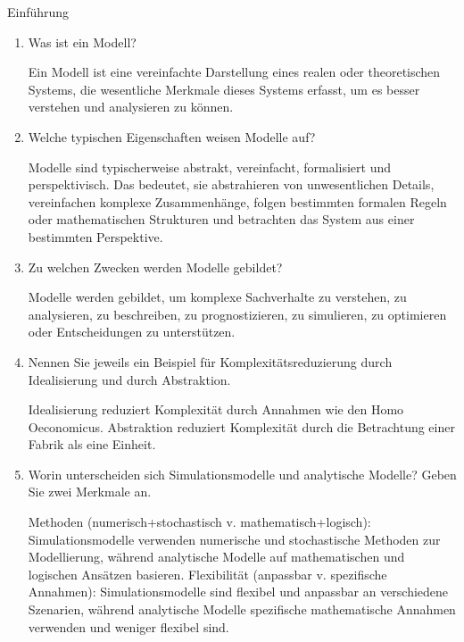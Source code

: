 \documentclass{article}
\author{Leopold Lemmermann}
\begin{document}
\createtitle

\begin{exercise}{Einführung}
  \begin{enumerate}
    \item Was ist ein Modell?
          \begin{solution}
            Ein Modell ist eine vereinfachte Darstellung eines realen oder theoretischen Systems, die wesentliche Merkmale dieses Systems erfasst, um es besser verstehen und analysieren zu können.
          \end{solution}

    \item Welche typischen Eigenschaften weisen Modelle auf?
          \begin{solution}
            Modelle sind typischerweise abstrakt, vereinfacht, formalisiert und perspektivisch. Das bedeutet, sie abstrahieren von unwesentlichen Details, vereinfachen komplexe Zusammenhänge, folgen bestimmten formalen Regeln oder mathematischen Strukturen und betrachten das System aus einer bestimmten Perspektive.
          \end{solution}

    \item Zu welchen Zwecken werden Modelle gebildet?
          \begin{solution}
            Modelle werden gebildet, um komplexe Sachverhalte zu verstehen, zu analysieren, zu beschreiben, zu prognostizieren, zu simulieren, zu optimieren oder Entscheidungen zu unterstützen.
          \end{solution}

    \item Nennen Sie jeweils ein Beispiel für Komplexitätsreduzierung durch Idealisierung und durch Abstraktion.
          \begin{solution}
            Idealisierung reduziert Komplexität durch Annahmen wie den Homo Oeconomicus. Abstraktion reduziert Komplexität durch die Betrachtung einer Fabrik als eine Einheit.
          \end{solution}

    \item Worin unterscheiden sich Simulationsmodelle und analytische Modelle? Geben Sie zwei Merkmale an.
          \begin{solution}
            Methoden (numerisch+stochastisch v. mathematisch+logisch): Simulationsmodelle verwenden numerische und stochastische Methoden zur Modellierung, während analytische Modelle auf mathematischen und logischen Ansätzen basieren.
            Flexibilität (anpassbar v. spezifische Annahmen): Simulationsmodelle sind flexibel und anpassbar an verschiedene Szenarien, während analytische Modelle spezifische mathematische Annahmen verwenden und weniger flexibel sind.
          \end{solution}


\end{enumerate}
\end{exercise}
\end{document}
